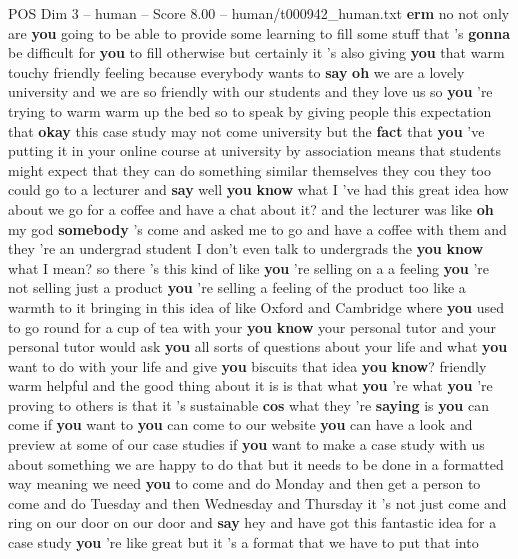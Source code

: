 \begin{textsample}{POS Dim 3 – human – Score 8.00 – human/t000942\_human.txt}  \label{ex:f3_pos_004}
\textbf{erm} no not only are \textbf{you} going to be able to provide some learning to fill some stuff that 's \textbf{gonna} be difficult for \textbf{you} to fill otherwise but certainly it 's also giving \textbf{you} that warm touchy friendly feeling because everybody wants to \textbf{say} \textbf{oh} we are a lovely university and we are so friendly with our students and they love us so \textbf{you} 're trying to warm warm up the bed so to speak by giving people this expectation that \textbf{okay} this case study may not come university but the \textbf{fact} that \textbf{you} 've putting it in your online course at university by association means that students might expect that they can do something similar themselves they cou they too could go to a lecturer and \textbf{say} well \textbf{you} \textbf{know} what I 've had this great idea how about we go for a coffee and have a chat about it? and the lecturer was like \textbf{oh} my god \textbf{somebody} 's come and asked me to go and have a coffee with them and they 're an undergrad student I don't even talk to undergrads the \textbf{you} \textbf{know} what I mean? so there 's this kind of like \textbf{you} 're selling on a a feeling \textbf{you} 're not selling just a product \textbf{you} 're selling a feeling of the product too like a warmth to it bringing in this idea of like Oxford and Cambridge where \textbf{you} used to go round for a cup of tea with your \textbf{you} \textbf{know} your personal tutor and your personal tutor would ask \textbf{you} all sorts of questions about your life and what \textbf{you} want to do with your life and give \textbf{you} biscuits that idea \textbf{you} \textbf{know}? friendly warm helpful and the good thing about it is is that what \textbf{you} 're what \textbf{you} 're proving to others is that it 's sustainable \textbf{cos} what they 're \textbf{saying} is \textbf{you} can come if \textbf{you} want to \textbf{you} can come to our website \textbf{you} can have a look and preview at some of our case studies if \textbf{you} want to make a case study with us about something we are happy to do that but it needs to be done in a formatted way meaning we need \textbf{you} to come and do Monday and then get a person to come and do Tuesday and then Wednesday and Thursday it 's not just come and ring on our door on our door and \textbf{say} hey and have got this fantastic idea for a case study \textbf{you} 're like great but it 's a format that we have to put that into

\end{textsample}

